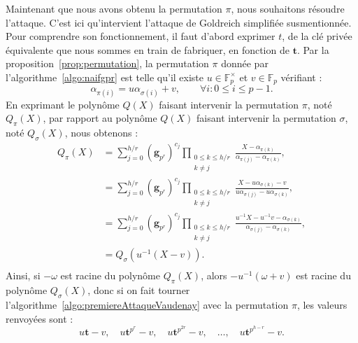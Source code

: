 \documentclass[a4paper, titlepage, 11pt]{article}
\theoremstyle{definition}
\theoremstyle{remark}
\def\gf #1{\mathbb{F}_{#1}}
\def\mbf #1{\mathbf{#1}}
\begin{document}
Maintenant que nous avons obtenu la permutation $\pi$, nous souhaitons résoudre l'attaque. C'est ici qu'intervient l'attaque de Goldreich simplifiée susmentionnée. Pour comprendre son fonctionnement, il faut d'abord exprimer $t$, de la clé privée équivalente que nous sommes en train de fabriquer, en fonction de $\mbf t$. Par la proposition~\ref{prop:permutation}, la permutation $\pi$ donnée par l'algorithme~\ref{algo:naifgpr} est telle qu'il existe $u \in \gf{p}^\times$ et $v \in \gf{p}$ vérifiant :
$$\alpha_{\pi(i)} = u \alpha_{\sigma(i)} + v, \qquad \forall i : 0 \leqslant i \leqslant p-1.$$
En exprimant le polynôme $Q(X)$ faisant intervenir la permutation $\pi$, noté $Q_\pi(X)$, par rapport au polynôme $Q(X)$ faisant intervenir la permutation $\sigma$, noté $Q_\sigma(X)$, nous obtenons :
\begin{align*}
Q_\pi(X) &= \sum_{j=0}^{h/r} (\mbf g_{p^r})^{c_{j}} \prod_{\substack{0\leqslant k\leqslant h/r \\ k \neq j}}\frac{X-\alpha_{\pi(k)}}{\alpha_{\pi(j)}-\alpha_{\pi(k)}}, \\
&= \sum_{j=0}^{h/r} (\mbf g_{p^r})^{c_{j}} \prod_{\substack{0\leqslant k\leqslant h/r \\ k \neq j}}\frac{X-u\alpha_{\sigma(k)} - v}{u\alpha_{\sigma(j)}-u\alpha_{\sigma(k)}}, \\
&= \sum_{j=0}^{h/r} (\mbf g_{p^r})^{c_{j}} \prod_{\substack{0\leqslant k\leqslant h/r \\ k \neq j}}\frac{u^{-1}X - u^{-1}v-\alpha_{\sigma(k)}}{\alpha_{\sigma(j)}-\alpha_{\sigma(k)}}, \\
&= Q_\sigma(u^{-1}(X -v)). \\
\end{align*}
Ainsi, si $-\omega$ est racine du polynôme $Q_\pi(X)$, alors $-u^{-1}(\omega +v)$ est racine du polynôme $Q_\sigma(X)$, donc si on fait tourner l'algorithme~\ref{algo:premiereAttaqueVaudenay} avec la permutation $\pi$, les valeurs renvoyées sont :
$$u \mbf t -v,\quad u \mbf t^{p^r} -v,\quad u \mbf t^{p^{2r}} -v,\quad \dots,\quad u \mbf t^{p^{h - r}} -v.$$
\end{document}
